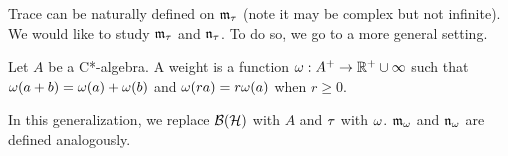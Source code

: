 Trace can be naturally defined on $\mathfrak{m}_\tau$ (note it may be complex but not infinite). We would like to study $\mathfrak{m}_\tau$ and $\mathfrak{n}_\tau$. To do so, we go to a more general setting.

\begin{dfn}
    Let $A$ be a C*-algebra. A weight is a function $\omega: A^+ \rightarrow {\mathbb R}^+ \cup \infty$ such that $\omega(a+b) = \omega(a) + \omega(b)$ and $\omega(ra) = r\omega(a)$ when $r \geq 0$.
\end{dfn}

\begin{remark}
    In this generalization, we replace ${\mathcal B}({\mathcal H})$ with $A$ and $\tau$ with $\omega$. $\mathfrak m_\omega$ and $\mathfrak n_\omega$ are defined analogously.
\end{remark}
